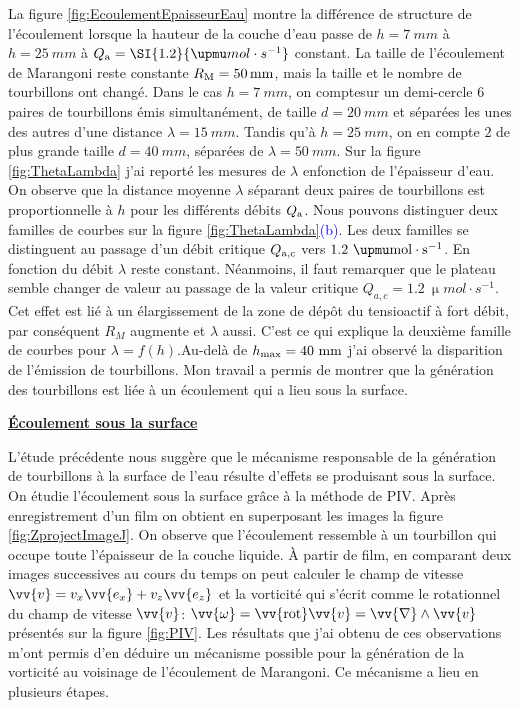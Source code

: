 \documentclass[french, 10pt]{article}
\begin{document}
La figure \ref{fig:EcoulementEpaisseurEau} montre la différence de structure de l'écoulement lorsque la hauteur de la couche d'eau passe de $h=\SI{7}{mm}$ à $h=\SI{25}{mm}$ à $Q_{\rm a}=\SI{1.2}{\upmu mol\cdot s^{-1}}$ constant. La taille de l'écoulement de Marangoni reste constante $R_{\rm M} = \SI{50}{mm}$, mais la taille et le nombre de tourbillons ont changé. Dans le cas $h=\SI{7}{mm}$, on comptesur un demi-cercle $6$ paires de tourbillons émis simultanément, de taille $d=\SI{20}{mm}$ et séparées les unes des autres d'une distance $\lambda = \SI{15}{mm}$. Tandis qu'à $h=\SI{25}{mm}$, on en compte $2$ de plus grande taille $d=\SI{40}{mm}$, séparées de $\lambda = \SI{50}{mm}$. Sur la figure \ref{fig:ThetaLambda} j'ai reporté les mesures de $\lambda$ enfonction de l'épaisseur d'eau. On observe que la distance moyenne $\lambda$ séparant deux paires de tourbillons est proportionnelle à $h$ pour les différents débits  $Q_{\rm a}$. Nous pouvons distinguer deux familles de courbes sur la figure \ref{fig:ThetaLambda}\textcolor{blue}{(b)}. Les deux familles se distinguent au passage d'un débit critique $Q_{\rm a,c}$ vers $1.2~\rm \upmu mol\cdot s^{-1}$. 
En fonction du débit $\lambda$ reste constant. Néanmoins, il faut remarquer que le plateau semble changer de valeur au passage de la valeur critique $Q_{a,c}=\SI{1.2}{\upmu mol\cdot s^{-1}}$. Cet effet est lié à un élargissement de la zone de dépôt du tensioactif à fort débit, par conséquent $R_M$ augmente et $\lambda$ aussi. C'est ce qui explique la deuxième famille de courbes pour $\lambda =f(h)$.Au-delà de $h_{\rm max} = 40~\rm mm$ j'ai observé la disparition de l'émission de tourbillons. Mon travail a permis de montrer que la génération des tourbillons est liée à un écoulement qui a lieu sous la surface.\medskip

\noindent\underline{\textbf{Écoulement sous la surface}}\medskip

L'étude précédente nous suggère que le mécanisme responsable de la génération de tourbillons à la surface de l'eau résulte d'effets se produisant sous la surface. On étudie l'écoulement sous la surface grâce à la méthode de PIV. Après enregistrement d'un film on obtient en superposant les images la figure \ref{fig:ZprojectImageJ}. On observe que l'écoulement ressemble à un tourbillon qui occupe toute l'épaisseur de la couche liquide. À partir de film, en comparant deux images successives au cours du temps on peut calculer le champ de vitesse $\vv{v} = v_{x}\vv{e_{x}}+v_{z}\vv{e_z} \label{eq:ChampVitesse}$ et la vorticité qui s'écrit comme le rotationnel du champ de vitesse $\vv{v}$: $\vv{\omega}= \vv{\text{rot}}\vv{v}=\vv{\nabla}\wedge\vv{v} \label{eq:VecteurTourbillon}$ présentés sur la figure \ref{fig:PIV}. Les résultats que j'ai obtenu de ces observations m'ont permis d'en déduire un mécanisme possible pour la génération de la vorticité au voisinage de l'écoulement de Marangoni. Ce mécanisme a lieu en plusieurs étapes.\medskip
\end{document}
